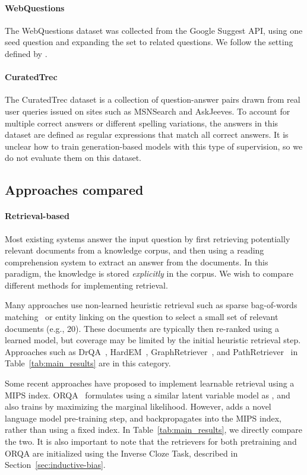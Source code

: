 \documentclass{article}
\begin{document}
\paragraph{WebQuestions} The WebQuestions dataset \cite{webquestions} was collected from the Google Suggest API, using one seed question and expanding the set to related questions. We follow the setting defined by \citet{drqa}.

\paragraph{CuratedTrec}
The CuratedTrec dataset is a collection of question-answer pairs drawn from real user queries issued on sites such as MSNSearch and AskJeeves. To account for multiple correct answers or different spelling variations, the answers in this dataset are defined as regular expressions that match all correct answers. It is unclear how to train generation-based models with this type of supervision, so we do not evaluate them on this dataset.

\subsection{Approaches compared}
\label{sec:comparisons}
\paragraph{Retrieval-based \openqa}
Most existing \openqa systems answer the input question by first retrieving potentially relevant documents from a knowledge corpus, and then using a reading comprehension system to extract an answer from the documents. In this paradigm, the knowledge is stored \emph{explicitly} in the corpus.
We wish to compare different methods for implementing retrieval.

Many approaches use non-learned heuristic retrieval such as sparse bag-of-words matching~\cite{bm25} or entity linking on the question to select a small set of relevant documents (e.g., 20). These documents are typically then re-ranked using a learned model, but coverage may be limited by the initial heuristic retrieval step. Approaches such as DrQA~\cite{drqa}, HardEM~\cite{openqa_hardem}, GraphRetriever~\cite{GraphRetriever}, and PathRetriever~\cite{rrp_salesforce} in Table~\ref{tab:main_results} are in this category.

Some recent approaches have proposed to implement learnable retrieval using a MIPS index. ORQA~\cite{orqa} formulates \openqa using a similar latent variable model as \thename, and also trains by maximizing the marginal likelihood. However, \thename adds a novel language model pre-training step, and backpropagates into the MIPS index, rather than using a fixed index. In Table~\ref{tab:main_results}, we directly compare the two. It is also important to note that the retrievers for both \thename pretraining and ORQA are initialized using the Inverse Cloze Task, described in Section~\ref{sec:inductive-bias}.
\end{document}
